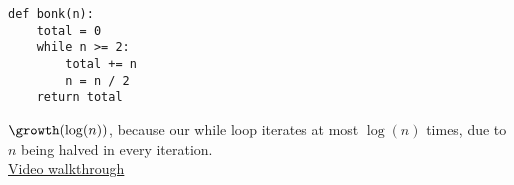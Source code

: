 \begin{blocksection}
\question \begin{lstlisting}
def bonk(n):
    total = 0
    while n >= 2:
        total += n
        n = n / 2
    return total
\end{lstlisting}

\begin{solution}[0.0in]
  $\growth(\log(n))$, because our while loop iterates at most $\log(n)$ times,
  due to $n$ being halved in every iteration.\\
\href{https://www.youtube.com/watch?v=XsdTV6cAAjY&vq=hd1080&t=33m18s}{Video walkthrough}
\end{solution}
\end{blocksection}
